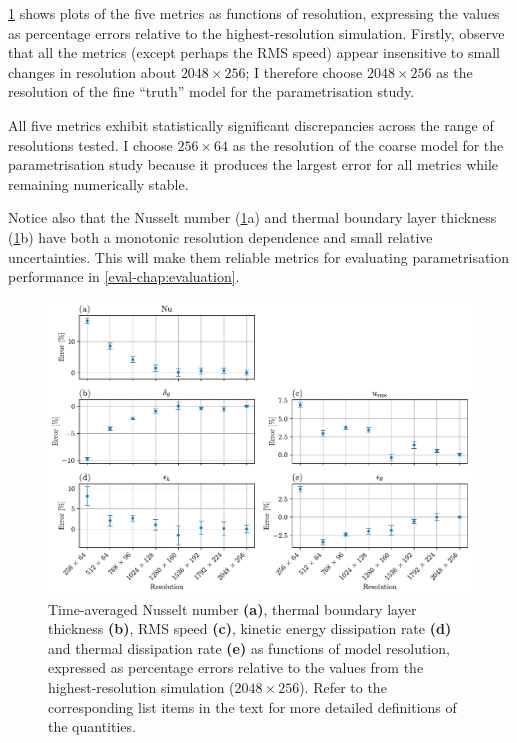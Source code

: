 \documentclass[../main.tex]{subfiles}
\begin{document}
\cref{fig:resolution_dependence} shows plots of the five metrics as functions
of resolution, expressing the values as percentage errors relative to the
highest-resolution simulation. Firstly, observe that all the metrics (except
perhaps the RMS speed) appear insensitive to small changes in resolution about
$2048 \times 256$; I therefore choose $2048 \times 256$ as the resolution of the
fine ``truth'' model for the parametrisation study.

All five metrics exhibit statistically significant discrepancies across the
range of resolutions tested. I choose $256 \times 64$ as the resolution of the
coarse model for the parametrisation study because it produces the largest
error for all metrics while remaining numerically stable.

Notice also that the Nusselt number (\cref{fig:resolution_dependence}a)
and thermal boundary layer thickness (\cref{fig:resolution_dependence}b)
have both a monotonic resolution dependence and small relative uncertainties.
This will make them reliable metrics for evaluating parametrisation
performance in \cref{eval-chap:evaluation}.

\begin{figure}[ht]
    \centering
    \includegraphics[width=\linewidth]{figures/resolution_dependence.pdf}
    \caption{
        Time-averaged Nusselt number \textbf{(a)}, thermal boundary layer
        thickness \textbf{(b)}, RMS speed \textbf{(c)}, kinetic energy
        dissipation rate \textbf{(d)} and thermal dissipation rate \textbf{(e)}
        as functions of model resolution, expressed as percentage errors
        relative to the values from the highest-resolution simulation ($2048
        \times 256$). Refer to the corresponding list items in the text for
        more detailed definitions of the quantities.
    }
    \label{fig:resolution_dependence}
\end{figure}


\ifSubfilesClassLoaded{%
    \emergencystretch=5em
    \printbibliography{}
}{}
\end{document}
